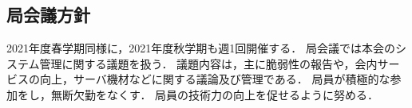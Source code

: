 \subsection*{局会議方針}

2021年度春学期同様に，2021年度秋学期も週1回開催する．
局会議では本会のシステム管理に関する議題を扱う．
議題内容は，主に脆弱性の報告や，会内サービスの向上，サーバ機材などに関する議論及び管理である．
局員が積極的な参加をし，無断欠勤をなくす．
局員の技術力の向上を促せるように努める．
